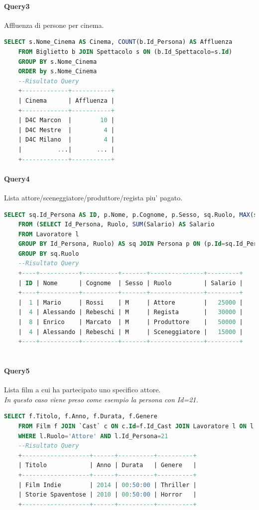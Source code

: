 \documentclass[10pt]{article}
\begin{document}
	\paragraph{Query3}
	Affluenza di persone per cinema.
	\begin{lstlisting}[language=SQL]
	SELECT s.Nome_Cinema AS Cinema, COUNT(b.Id_Persona) AS Affluenza
	FROM Biglietto b JOIN Spettacolo s ON (b.Id_Spettacolo=s.Id)
	GROUP BY s.Nome_Cinema
	ORDER by s.Nome_Cinema	
	--Risultato Query
	+-------------+-----------+
	| Cinema      | Affluenza |
	+-------------+-----------+
	| D4C Marcon  |        10 |
	| D4C Mestre  |         4 |
	| D4C Milano  |         4 |
	|          ...|       ... |
	+-------------+-----------+	
	\end{lstlisting}
	\paragraph{Query4}
	Lista attore/sceneggiatore/produttore/regista piu' pagato.
	\begin{lstlisting}[language=SQL]
	SELECT sq.Id_Persona AS ID, p.Nome, p.Cognome, p.Sesso, sq.Ruolo, MAX(sq.Salario) AS Salario
	FROM (SELECT Id_Persona, Ruolo, SUM(Salario) AS Salario
	FROM Lavoratore l
	GROUP BY Id_Persona, Ruolo) AS sq JOIN Persona p ON (p.Id=sq.Id_Persona)
	GROUP BY sq.Ruolo	
	--Risultato Query
	+----+-----------+----------+-------+---------------+---------+
	| ID | Nome      | Cognome  | Sesso | Ruolo         | Salario |
	+----+-----------+----------+-------+---------------+---------+
	|  1 | Mario     | Rossi    | M     | Attore        |   25000 |
	|  4 | Alessando | Rebeschi | M     | Regista       |   30000 |
	|  8 | Enrico    | Marcato  | M     | Produttore    |   50000 |
	|  4 | Alessando | Rebeschi | M     | Sceneggiatore |   15000 |
	+----+-----------+----------+-------+---------------+---------+
	
	\end{lstlisting}
	\paragraph{Query5}
	
	Lista film a cui ha partecipato uno specifico attore. \\\textit{In questo caso viene preso come esempio la persona con Id=21.}
	\begin{lstlisting}[language=SQL]
	SELECT f.Titolo, f.Anno, f.Durata, f.Genere
	FROM Film f JOIN `Cast` c ON c.Id=f.Id_Cast JOIN Lavoratore l ON l.Id_Cast=c.Id
	WHERE l.Ruolo='Attore' AND l.Id_Persona=21	
	--Risultato Query
	+-------------------+------+----------+----------+
	| Titolo            | Anno | Durata   | Genere   |
	+-------------------+------+----------+----------+
	| Film Indie        | 2014 | 00:50:00 | Thriller |
	| Storie Spaventose | 2010 | 00:50:00 | Horror   |
	+-------------------+------+----------+----------+
	
	\end{lstlisting}
\end{document}
